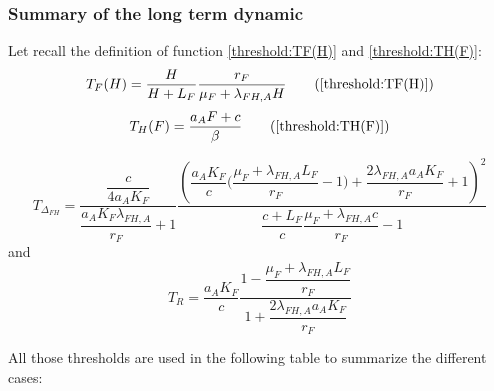 \documentclass{article}
\newcommand{\lfa}{\lambda_{FH, A}}
\begin{document}
\begin{itemize}
%
%
\end{itemize}


\subsubsection{Summary of the long term dynamic}
Let recall the definition of function \eqref{threshold:TF(H)} and \eqref{threshold:TH(F)}:
\begin{equation}
T_F(H) = \dfrac{H}{H + L_F}\dfrac{r_F}{\mu_F + \lfa H}
\tag{\ref{threshold:TF(H)}}
\end{equation}
\begin{equation}
T_H(F) = \dfrac{a_A F + c }{\beta}
\tag{\ref{threshold:TH(F)}}
\end{equation}

\begin{equation}
T_{\Delta_{FH}} = \dfrac{\dfrac{c}{4a_A K_F}}{\dfrac{a_A K_F \lfa}{r_F} + 1}\dfrac{\left(\dfrac{a_A K_F}{c} \Big(\dfrac{\mu_F + \lfa L_F}{r_F} - 1\Big)+ \dfrac{2 \lfa a_A K_F}{r_F} + 1 \right)^2}{\dfrac{c+L_F}{c} \dfrac{\mu_F + \lfa c}{r_F} - 1}
\end{equation}
and
\begin{equation}
T_R = \dfrac{a_AK_F}{c} \dfrac{1 - \dfrac{\mu_F + \lfa L_F}{r_F}}{1 + \dfrac{2 \lfa a_AK_F}{r_F}}
\end{equation}

All those thresholds are used in the following table to summarize the different cases:
\end{document}
